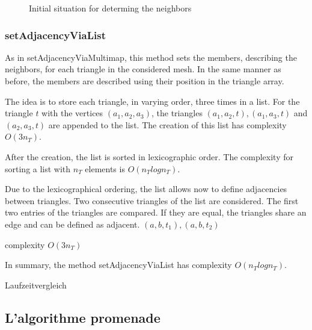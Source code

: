 \documentclass[10pt]{article}
\begin{document}
\begin{figure}[h]  
	\begin{minipage}{0.4\textwidth}
	\caption{Initial situation for determing the neighbors}
	\end{minipage}


\end{figure}


\subsubsection{setAdjacencyViaList} \label{list}
As in setAdjacencyViaMultimap, this method sets the members, describing the neighbors, for each triangle in the considered mesh. In the same manner as before, the members are described using their position in the triangle array.

The idea is to store each triangle, in varying order, three times in a list. For the triangle $t$ with the vertices $(a_1,a_2,a_3)$, the triangles $(a_1,a_2,t), (a_1,a_3,t)$ and $(a_2,a_3,t)$ are appended to the list. The creation of this list has complexity $O(3n_T)$.

After the creation, the list is sorted in lexicographic order. The complexity for sorting a list with $n_T$ elements is $O(n_Tlogn_T)$.

Due to the lexicographical ordering, the list allows now to define adjacencies between triangles. Two consecutive triangles of the list are considered. The first two entries of the triangles are compared. If they are equal, the triangles share an edge and can be defined as adjacent. $(a,b,t_1), (a,b,t_2)$

complexity $O(3n_T)$

In summary, the method setAdjacencyViaList has complexity $O(n_Tlogn_T)$.

Laufzeitvergleich

\subsection{L'algorithme promenade} \label{promenade}
\end{document}
